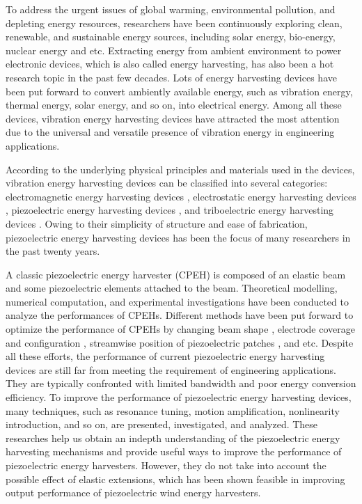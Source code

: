 \documentclass{elsarticle}
\begin{document}
To address the urgent issues of global warming, environmental pollution, and depleting energy resources, researchers have been continuously exploring clean, renewable, and sustainable energy sources, including solar energy, bio-energy, nuclear energy and etc. \cite{zhou2018review} Extracting energy from ambient environment to power electronic devices, which is also called energy harvesting, has also been a hot research topic in the past few decades. Lots of energy harvesting devices have been put forward to convert ambiently available energy, such as vibration energy, thermal energy, solar energy, and so on, into electrical energy. \cite{dagdeviren2017energy,safaei2019review} Among all these devices, vibration energy harvesting devices have attracted the most attention due to the universal and versatile presence of vibration energy in engineering applications. \cite{liu2018comprehensive}

According to the underlying physical principles and materials used in the devices, vibration energy harvesting devices can be classified into several categories: electromagnetic energy harvesting devices \cite{cepnik2013review,tan2016review}, electrostatic energy harvesting devices \cite{khan2016state,suzuki2011recent}, piezoelectric energy harvesting devices \cite{liu2018comprehensive,sodano2004review}, and triboelectric energy harvesting devices \cite{fan2016flexible,wang2015progress}. Owing to their simplicity of structure and ease of fabrication, piezoelectric energy harvesting devices has been the focus of many researchers in the past twenty years. \cite{anton2007review,safaei2019review}

A classic piezoelectric energy harvester (CPEH) is composed of an elastic beam and some piezoelectric elements attached to the beam. Theoretical modelling, numerical computation, and experimental investigations have been conducted to analyze the performances of CPEHs. \cite{erturk2008distributed,erturk2009experimentally} Different methods have been put forward to optimize the performance of CPEHs by changing beam shape \cite{goldschmidtboeing2008characterization}, electrode coverage \cite{fu2018electrode} and configuration \cite{kim2015effect}, streamwise position of piezoelectric patches \cite{liao2012optimal,patel2011geometric}, and etc. Despite all these efforts, the performance of current piezoelectric energy harvesting devices are still far from meeting the requirement of engineering applications. They are typically confronted with limited bandwidth and poor energy conversion efficiency. To improve the performance of piezoelectric energy harvesting devices, many techniques, such as resonance tuning, motion amplification, nonlinearity introduction, and so on, are presented, investigated, and analyzed. \cite{yildirim2017review,tran2018ambient} These researches help us obtain an indepth understanding of the piezoelectric energy harvesting mechanisms and provide useful ways to improve the performance of piezoelectric energy harvesters. However, they do not take into account the possible effect of elastic extensions, which has been shown feasible in improving output performance of piezoelectric wind energy harvesters.\cite{zhou2019piezoelectric}
\end{document}
